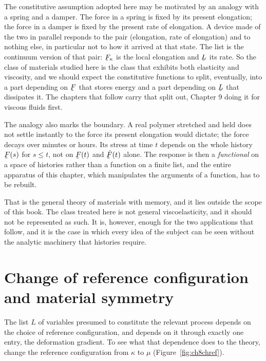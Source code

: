 The constitutive assumption adopted here may be motivated by an analogy
with a spring and a damper. The force in a spring is fixed by its
present elongation; the force in a damper is fixed by the present rate
of elongation. A device made of the two in parallel responds to the pair
(elongation, rate of elongation) and to nothing else, in particular not
to how it arrived at that state. The list  is the continuum
version of that pair: $\bF_{\kappa}$ is the local elongation and $\bL$
its rate. So the class of materials studied here is the class that
exhibits both elasticity and viscosity, and we should expect the
constitutive functions to split, eventually, into a part depending on
$\bF$ that stores energy and a part depending on $\bL$ that dissipates
it. The chapters that follow carry that split out, Chapter 9 doing it
for viscous fluids first.

\begin{remark}\label{rem:ch8viscoel}
The analogy also marks the boundary. A real polymer stretched and held
does not settle instantly to the force its present elongation would
dictate; the force decays over minutes or hours. Its stress at time $t$
depends on the whole history $\bF(s)$ for $s\leq t$, not on $\bF(t)$ and
$\dot\bF(t)$ alone. The response is then a \emph{functional} on a space
of histories rather than a function on a finite list, and the entire
apparatus of this chapter, which manipulates the arguments of a
function, has to be rebuilt.

That is the general theory of materials with memory, and it lies outside
the scope of this book. The class treated here is not general
viscoelasticity, and it should not be represented as such. It is,
however, enough for the two applications that follow, and it is the case
in which every idea of the subject can be seen without the analytic
machinery that histories require.
\end{remark}

\section{Change of reference configuration and material symmetry}
\label{sec:ch8symm}

The list $L$ of variables presumed to constitute the relevant process
depends on the choice of reference configuration, and depends on it
through exactly one entry, the deformation gradient. To see what that
dependence does to the theory, change the reference configuration from
$\kappa$ to $\mu$ (Figure~\ref{fig:ch8chref}).

